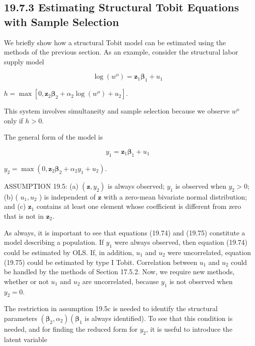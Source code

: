 \documentclass[10pt]{article}
\begin{document}
\subsection*{19.7.3 Estimating Structural Tobit Equations with Sample Selection}
We briefly show how a structural Tobit model can be estimated using the methods of the previous section. As an example, consider the structural labor supply model


\begin{equation*}
\log \left(w^{\mathrm{o}}\right)=\mathbf{z}_{1} \boldsymbol{\beta}_{1}+u_{1} \tag{19.72}
\end{equation*}


$h=\max \left[0, \mathbf{z}_{2} \boldsymbol{\beta}_{2}+\alpha_{2} \log \left(w^{\mathrm{o}}\right)+u_{2}\right]$.

This system involves simultaneity and sample selection because we observe $w^{\mathrm{o}}$ only if $h>0$.

The general form of the model is


\begin{equation*}
y_{1}=\mathbf{z}_{1} \boldsymbol{\beta}_{1}+u_{1} \tag{19.74}
\end{equation*}


$y_{2}=\max \left(0, \mathbf{z}_{2} \boldsymbol{\beta}_{2}+\alpha_{2} y_{1}+u_{2}\right)$.

ASSUMPTION 19.5: (a) $\left(\mathbf{z}, y_{2}\right)$ is always observed; $y_{1}$ is observed when $y_{2}>0$; (b) ( $u_{1}, u_{2}$ ) is independent of $\mathbf{z}$ with a zero-mean bivariate normal distribution; and (c) $\mathbf{z}_{1}$ contains at least one element whose coefficient is different from zero that is not in $\mathbf{z}_{2}$.

As always, it is important to see that equations (19.74) and (19.75) constitute a model describing a population. If $y_{1}$ were always observed, then equation (19.74) could be estimated by OLS. If, in addition, $u_{1}$ and $u_{2}$ were uncorrelated, equation (19.75) could be estimated by type I Tobit. Correlation between $u_{1}$ and $u_{2}$ could be handled by the methods of Section 17.5.2. Now, we require new methods, whether or not $u_{1}$ and $u_{2}$ are uncorrelated, because $y_{1}$ is not observed when $y_{2}=0$.

The restriction in assumption 19.5c is needed to identify the structural parameters $\left(\boldsymbol{\beta}_{2}, \alpha_{2}\right)\left(\boldsymbol{\beta}_{1}\right.$ is always identified). To see that this condition is needed, and for finding the reduced form for $y_{2}$, it is useful to introduce the latent variable
\end{document}
